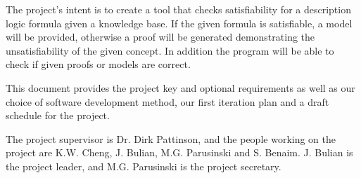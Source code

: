 The project's intent is to create a tool that checks satisfiability for a description logic formula given a knowledge base. If the given formula is satisfiable, a model will be provided, otherwise a proof will be generated demonstrating the unsatisfiability of the given concept. In addition the program will be able to check if given proofs or models are correct.

This document provides the project key and optional requirements as well as our choice of software development method, our first iteration plan and a draft schedule for the project.

The project supervisor is Dr. Dirk Pattinson, and the people working on the project
are K.W. Cheng, J. Bulian, M.G. Parusinski and S. Benaim. J. Bulian is the project leader, and M.G. Parusinski is the project secretary.

